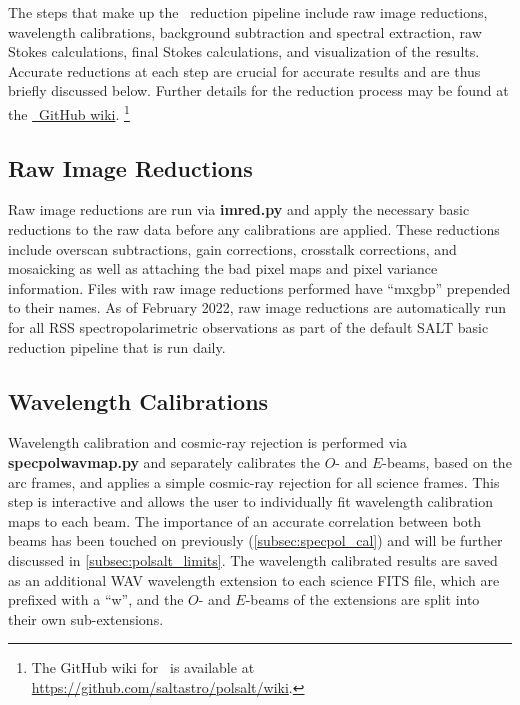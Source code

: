The steps that make up the \polsalt\ reduction pipeline include raw image reductions, wavelength calibrations, background subtraction and spectral extraction, raw Stokes calculations, final Stokes calculations, and visualization of the results.
Accurate reductions at each step are crucial for accurate results and are thus briefly discussed below.
Further details for the reduction process may be found at the \href{https://github.com/saltastro/polsalt/wiki}{\polsalt\ GitHub wiki}.%
\footnote{The GitHub wiki for \polsalt\ is available at \url{https://github.com/saltastro/polsalt/wiki}.}

\subsection{Raw Image Reductions} \label{subsec:pol_raw}

Raw image reductions are run via \textbf{imred.py} and apply the necessary basic reductions to the raw data before any calibrations are applied.
These reductions include overscan subtractions, gain corrections, crosstalk corrections, and mosaicking as well as attaching the bad pixel maps and pixel variance information.
Files with raw image reductions performed have ``mxgbp'' prepended to their names.
As of February 2022, raw image reductions are automatically run for all RSS spectropolarimetric observations as part of the default SALT basic reduction pipeline that is run daily.

\subsection{Wavelength Calibrations} \label{subsec:pol_wav}

Wavelength calibration and cosmic-ray rejection is performed via \textbf{specpolwavmap.py} and separately calibrates the $O$- and $E$-beams, based on the arc frames, and applies a simple cosmic-ray rejection for all science frames.
This step is interactive and allows the user to individually fit wavelength calibration maps to each beam.
The importance of an accurate correlation between both beams has been touched on previously (\autoref{subsec:specpol_cal}) and will be further discussed in \autoref{subsec:polsalt_limits}.
The wavelength calibrated results are saved as an additional \gls{WAV} wavelength extension to each science FITS file, which are prefixed with a ``w'', and the $O$- and $E$-beams of the extensions are split into their own sub-extensions.

